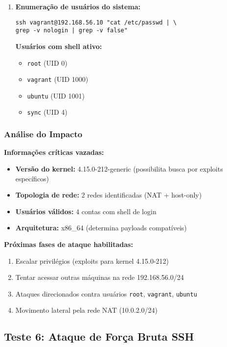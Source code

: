 \documentclass[12pt]{article}
\begin{document}
\begin{enumerate}
    \item \textbf{Enumeração de usuários do sistema:}
        \begin{verbatim}
ssh vagrant@192.168.56.10 "cat /etc/passwd | \
grep -v nologin | grep -v false"
        \end{verbatim}
        \textbf{Usuários com shell ativo:}
        \begin{itemize}
            \item \texttt{root} (UID 0)
            \item \texttt{vagrant} (UID 1000)
            \item \texttt{ubuntu} (UID 1001)
            \item \texttt{sync} (UID 4)
        \end{itemize}
\end{enumerate}

\subsubsection{Análise do Impacto}

\textbf{Informações críticas vazadas:}
\begin{itemize}
    \item \textbf{Versão do kernel:} 4.15.0-212-generic (possibilita busca por exploits específicos)
    \item \textbf{Topologia de rede:} 2 redes identificadas (NAT + host-only)
    \item \textbf{Usuários válidos:} 4 contas com shell de login
    \item \textbf{Arquitetura:} x86\_64 (determina payloads compatíveis)
\end{itemize}

\textbf{Próximas fases de ataque habilitadas:}
\begin{enumerate}
    \item Escalar privilégios (exploits para kernel 4.15.0-212)
    \item Tentar acessar outras máquinas na rede 192.168.56.0/24
    \item Ataques direcionados contra usuários \texttt{root}, \texttt{vagrant}, \texttt{ubuntu}
    \item Movimento lateral pela rede NAT (10.0.2.0/24)
\end{enumerate}

\subsection{Teste 6: Ataque de Força Bruta SSH}
\end{document}
